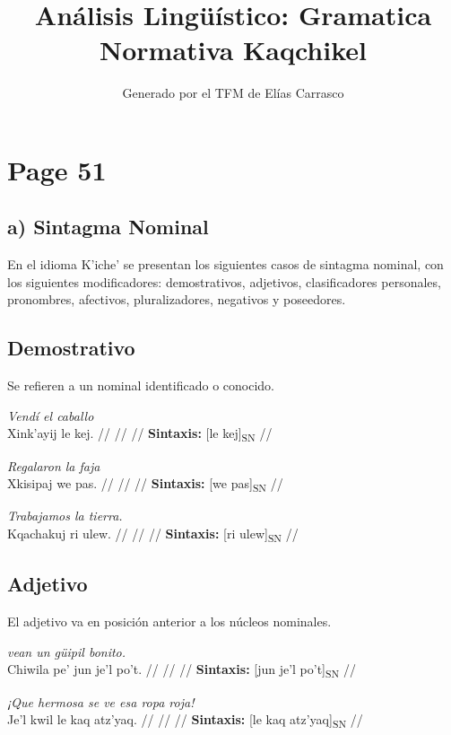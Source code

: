 \documentclass{article}%
\title{Análisis Lingüístico: Gramatica Normativa Kaqchikel}%
\author{Generado por el TFM de Elías Carrasco}%
\begin{document}
%
\normalsize%
\maketitle%
\section{Page 51}%
\label{sec:Page51}%
\subsection{a) Sintagma Nominal}%
\label{subsec:a)SintagmaNominal}%

%
En el idioma K’iche’ se presentan los siguientes casos de sintagma nominal, con los %
siguientes modificadores: demostrativos, adjetivos, clasificadores personales, pronombres, %
afectivos, pluralizadores, negativos y poseedores. %
\subsection{Demostrativo}%
\label{subsec:Demostrativo}%

%
Se refieren a un nominal identificado o conocido. %
\par\medskip%
\ex
\textit{Vendí el caballo} \\
\begingl
\gla Xink’ayij le kej. //
\glb  //
\glc  //
\glft \textbf{Sintaxis:} [le kej]\textsubscript{SN} //
\endgl
\xe
%
\medskip%
\par\medskip%
\ex
\textit{Regalaron la faja} \\
\begingl
\gla Xkisipaj we pas. //
\glb  //
\glc  //
\glft \textbf{Sintaxis:} [we pas]\textsubscript{SN} //
\endgl
\xe
%
\medskip%
\par\medskip%
\ex
\textit{Trabajamos la tierra.} \\
\begingl
\gla Kqachakuj ri ulew. //
\glb  //
\glc  //
\glft \textbf{Sintaxis:} [ri ulew]\textsubscript{SN} //
\endgl
\xe
%
\medskip%
\subsection{Adjetivo}%
\label{subsec:Adjetivo}%

%
El adjetivo va en posición anterior a los núcleos nominales. %
\par\medskip%
\ex
\textit{vean un güipil bonito.} \\
\begingl
\gla Chiwila pe’ jun je’l po’t. //
\glb  //
\glc  //
\glft \textbf{Sintaxis:} [jun je’l po’t]\textsubscript{SN} //
\endgl
\xe
%
\medskip%
\par\medskip%
\ex
\textit{¡Que hermosa se ve esa ropa roja!} \\
\begingl
\gla Je’l kwil le kaq atz’yaq. //
\glb  //
\glc  //
\glft \textbf{Sintaxis:} [le kaq atz’yaq]\textsubscript{SN} //
\endgl
\xe
%
\medskip%
\end{document}
